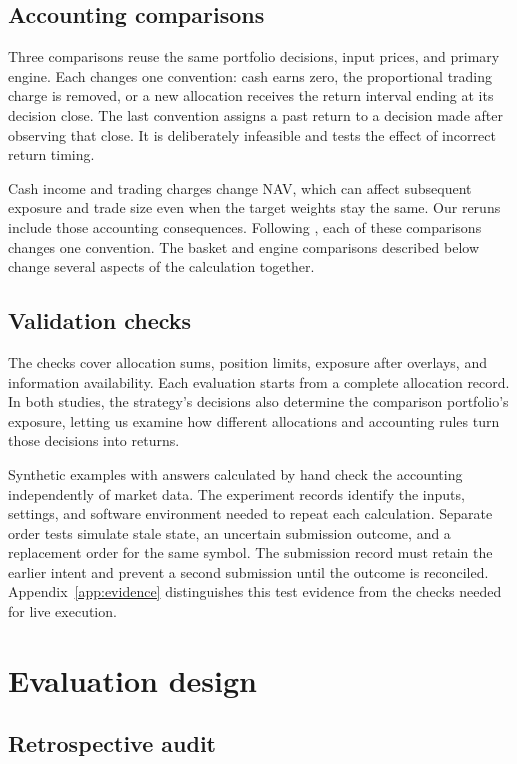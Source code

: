 \documentclass{article}
\begin{document}
\subsection{Accounting comparisons}

Three comparisons reuse the same portfolio decisions, input prices, and primary engine. Each changes one convention: cash earns zero, the proportional trading charge is removed, or a new allocation receives the return interval ending at its decision close. The last convention assigns a past return to a decision made after observing that close. It is deliberately infeasible and tests the effect of incorrect return timing.

Cash income and trading charges change NAV, which can affect subsequent exposure and trade size even when the target weights stay the same. Our reruns include those accounting consequences. Following \citet{zhang2026alpha}, each of these comparisons changes one convention. The basket and engine comparisons described below change several aspects of the calculation together.

\subsection{Validation checks}

The checks cover allocation sums, position limits, exposure after overlays, and information availability. Each evaluation starts from a complete allocation record. In both studies, the strategy's decisions also determine the comparison portfolio's exposure, letting us examine how different allocations and accounting rules turn those decisions into returns.

Synthetic examples with answers calculated by hand check the accounting independently of market data. The experiment records identify the inputs, settings, and software environment needed to repeat each calculation. Separate order tests simulate stale state, an uncertain submission outcome, and a replacement order for the same symbol. The submission record must retain the earlier intent and prevent a second submission until the outcome is reconciled. Appendix~\ref{app:evidence} distinguishes this test evidence from the checks needed for live execution.

\section{Evaluation design}

\subsection{Retrospective audit}
\end{document}
